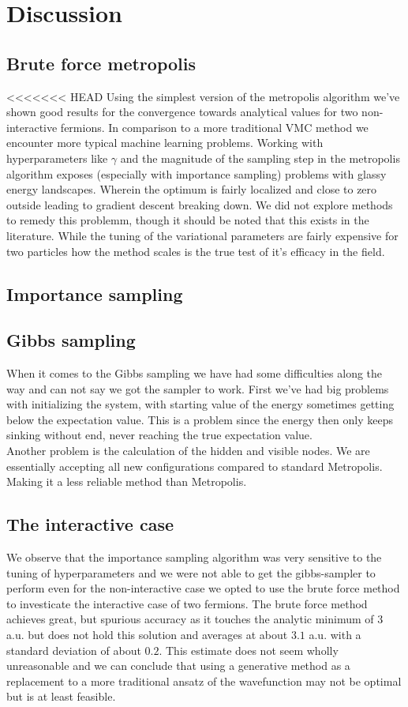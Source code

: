\section{Discussion}
\subsection{Brute force metropolis}

<<<<<<< HEAD
Using the simplest version of the metropolis algorithm we've shown good results for the convergence towards analytical values for two non-interactive fermions. In comparison to a more traditional VMC method we encounter more typical machine learning problems. Working with hyperparameters like $\gamma$ and the magnitude of the sampling step in the metropolis algorithm exposes (especially with importance sampling) problems with glassy energy landscapes. Wherein the optimum is fairly localized and close to zero outside leading to gradient descent breaking down. We did not explore methods to remedy this problemm, though it should be noted  that this exists in the literature.  While the tuning of the variational parameters are fairly expensive for two particles how the method scales is the  true test of it's efficacy in the field. 

\subsection{Importance sampling}

\subsection{Gibbs sampling}
When it comes to the Gibbs sampling we have had some difficulties along the way and can not say we got the sampler to work.
First we've had big problems with initializing the system, with starting value of the energy sometimes getting below the expectation value. This is a problem since the energy then only keeps sinking without end, never reaching the true expectation value. \\
Another problem is the calculation of the hidden and visible nodes. We are essentially accepting all new configurations compared to standard Metropolis. Making it a less reliable method than Metropolis. 
\subsection{The interactive case}

We observe that the importance sampling algorithm was very sensitive to the tuning of hyperparameters and we were not able to get the gibbs-sampler to perform even for the non-interactive case we opted to use the brute force method to investicate the interactive case of two fermions. The brute force method achieves great, but spurious accuracy as it touches the analytic minimum of 3 a.u. but does not hold this solution and averages at about $3.1$ a.u. with a standard deviation of about $0.2$. This estimate does not seem wholly unreasonable  and we can conclude that using a generative method as a replacement to a more traditional ansatz of the wavefunction may not be optimal but is at least feasible. 
